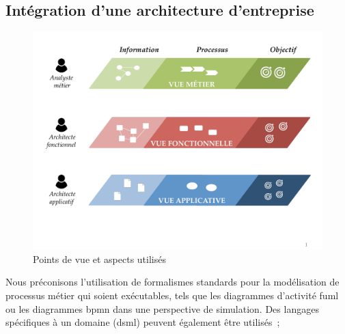 \subsection{Intégration d'une architecture d'entreprise}




\begin{figure}[!ht]
    \begin{center}
    \includegraphics[trim= 0cm 3cm 0cm 0cm, width=1\textwidth]{figures/4_demarche/vue_aspect.pdf}
    \end{center}
    \caption{Points de vue et aspects utilisés} \label{fig:vue_aspect}
\end{figure}

Nous
préconisons l'utilisation de formalismes standards pour la modélisation de
processus métier qui soient exécutables, tels que les diagrammes d'activité \gls{fuml} 
ou les diagrammes \gls{bpmn} dans une perspective de simulation. Des langages
spécifiques à un domaine (\gls{dsml}) peuvent également être utilisés~;



